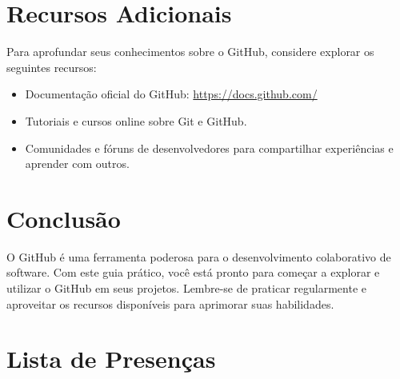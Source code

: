\documentclass{abntex2}
\begin{document}
\section{Recursos Adicionais}
Para aprofundar seus conhecimentos sobre o GitHub, considere explorar os seguintes recursos:
\begin{itemize}
    \item Documentação oficial do GitHub: \url{https://docs.github.com/}
    \item Tutoriais e cursos online sobre Git e GitHub.
    \item Comunidades e fóruns de desenvolvedores para compartilhar experiências e aprender com outros.
\end{itemize}
\section{Conclusão}
O GitHub é uma ferramenta poderosa para o desenvolvimento colaborativo de software. Com este guia prático, você está pronto para começar a explorar e utilizar o GitHub em seus projetos. Lembre-se de praticar regularmente e aproveitar os recursos disponíveis para aprimorar suas habilidades.
\newpage
\section{Lista de Presenças}
\noindent

\end{document}
